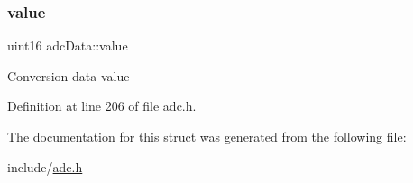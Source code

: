 \subsubsection{\texorpdfstring{value}{value}}
{\footnotesize\ttfamily uint16 adc\+Data\+::value}

Conversion data value 

Definition at line 206 of file adc.\+h.



The documentation for this struct was generated from the following file\+:\begin{DoxyCompactItemize}
\item 
include/\mbox{\hyperlink{adc_8h}{adc.\+h}}\end{DoxyCompactItemize}
